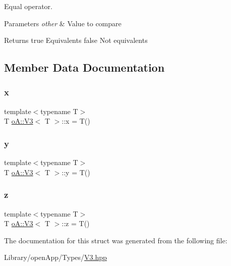 Equal operator. 


\begin{DoxyParams}{Parameters}
{\em other} & Value to compare \\
\hline
\end{DoxyParams}
\begin{DoxyReturn}{Returns}
true Equivalents  false Not equivalents 
\end{DoxyReturn}


\subsection{Member Data Documentation}
\mbox{\label{structo_a_1_1_v3_a2171113146a81277db6009a5c6af883f}} 
\subsubsection{\texorpdfstring{x}{x}}
{\footnotesize\ttfamily template$<$typename T$>$ \\
T \mbox{\hyperlink{structo_a_1_1_v3}{o\+A\+::\+V3}}$<$ T $>$\+::x = T()}

\mbox{\label{structo_a_1_1_v3_a04cf470d60a012fe0dc40a92c7ec9e73}} 
\subsubsection{\texorpdfstring{y}{y}}
{\footnotesize\ttfamily template$<$typename T$>$ \\
T \mbox{\hyperlink{structo_a_1_1_v3}{o\+A\+::\+V3}}$<$ T $>$\+::y = T()}

\mbox{\label{structo_a_1_1_v3_a30e27d6464ac2143637bfc675a1e5dd7}} 
\subsubsection{\texorpdfstring{z}{z}}
{\footnotesize\ttfamily template$<$typename T$>$ \\
T \mbox{\hyperlink{structo_a_1_1_v3}{o\+A\+::\+V3}}$<$ T $>$\+::z = T()}



The documentation for this struct was generated from the following file\+:\begin{DoxyCompactItemize}
\item 
Library/open\+App/\+Types/\mbox{\hyperlink{_v3_8hpp}{V3.\+hpp}}\end{DoxyCompactItemize}
